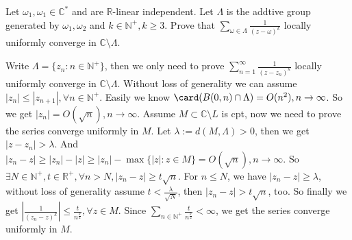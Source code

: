\documentclass{ctexart}
\begin{document}
\begin{problem}
  Let \(\omega_1,\omega_1 \in \mathbb{C}^*\) and are \(\mathbb{R}\)-linear independent. 
  Let \(\Lambda\) is the addtive group generated by \(\omega_1,\omega_2\) and \(k \in \mathbb{N}^+,k \geq 3 \). 
  Prove that \(\sum_{\omega \in \Lambda} \frac{1}{(z-\omega)^k}\) locally uniformly converge in \(\mathbb{C} \setminus \Lambda\). 
\end{problem}

\begin{solution}
  Write \(\Lambda=\{z_n:n \in \mathbb{N}^+\}\), then we only need to prove \(\sum_{n=1}^{\infty} \frac{1}{(z-z_n)^k}\) locally uniformly converge in \(\mathbb{C} \setminus \Lambda\). 
  Without loss of generality we can assume \(|z_n| \leq |z_{n+1}|,\forall n \in \mathbb{N}^+\). 
  Easily we know \(\card(B(0,n)\cap \Lambda)=O(n^2),n \to \infty\). 
  So we get \(|z_n|=O(\sqrt{n}),n \to \infty\). 
  Assume \(M \subset \mathbb{C}\setminus L\) is cpt, now we need to prove the series converge uniformly in \(M\). 
  Let \(\lambda:=d(M,\Lambda)>0\), then we get \(|z-z_n|>\lambda\). 
  And \(|z_n-z| \geq |z_n|-|z| \geq |z_n|-\max\{|z|:z \in M\}=O(\sqrt{n}),n \to \infty\). 
  So \(\exists N \in \mathbb{N}^+,t \in \mathbb{R}^+,\forall n>N,|z_n-z| \geq t \sqrt{n}\). 
  For \(n \leq N\), we have \(|z_n-z| \geq \lambda\), without loss of generality assume \(t<\frac{\lambda}{\sqrt{N}}\), then \(|z_n-z| >t \sqrt{n}\), too. 
  So finally we get \(\left|\frac{1}{(z_n-z)^k}\right| \leq \frac{t}{n^{ \frac{k}{2}}}, \forall z \in M\). 
  Since \(\sum_{n \in \mathbb{N}^+} \frac{t}{n^{ \frac{k}{2}}}<\infty\), we get the series converge uniformly in \(M\). 
\end{solution}

\begin{problem}
  
\end{problem}
\end{document}
